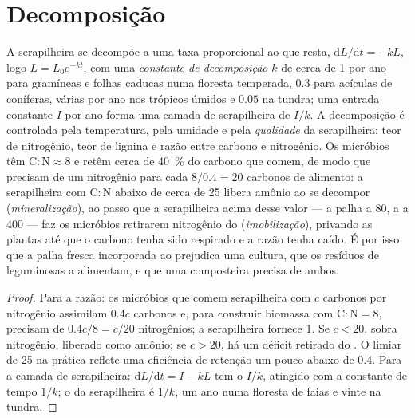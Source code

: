 \section{Decomposição}

\begin{theorem}\label{thm:b2:living-soil:decay}
A serapilheira se decompõe a uma taxa proporcional ao que resta,
$\mathrm{d}L/\mathrm{d}t = -kL$, logo $L = L_0 e^{-kt}$, com uma
\emph{constante de decomposição} $k$ de cerca de 1 por ano para gramíneas
e folhas caducas numa floresta temperada, $0.3$ para acículas de
coníferas, várias por ano nos trópicos úmidos e $0.05$ na tundra;
uma entrada constante $I$ por ano forma uma camada de serapilheira de
$I/k$. A decomposição é controlada pela temperatura, pela umidade e pela
\emph{qualidade} da serapilheira: teor de nitrogênio, teor de lignina e
razão entre carbono e nitrogênio. Os micróbios têm $\mathrm{C:N} \approx 8$
e retêm cerca de \qty{40}{\%} do carbono que comem, de modo que precisam
de um nitrogênio para cada $8/0.4 = 20$ carbonos de alimento: a
serapilheira com $\mathrm{C:N}$
abaixo de cerca de 25 libera amônio ao se decompor
(\emph{mineralização}), ao passo que a serapilheira acima desse valor ---
a palha a 80, a  a 400 --- faz os micróbios retirarem nitrogênio
do  (\emph{imobilização}), privando as plantas até que o carbono
tenha sido respirado e a razão tenha caído. É por isso que a palha
fresca incorporada ao  prejudica uma cultura, que os resíduos de
leguminosas a alimentam, e que uma composteira precisa de ambos.
\end{theorem}
\begin{proof}
Para a razão: os micróbios que comem serapilheira com $c$ carbonos por
nitrogênio assimilam $0.4c$ carbonos e, para construir biomassa com
$\mathrm{C:N} = 8$, precisam de $0.4c/8 = c/20$ nitrogênios; a
serapilheira fornece 1. Se $c < 20$, sobra nitrogênio, liberado como
amônio; se $c > 20$, há um déficit retirado do . O limiar de 25 na
prática reflete uma eficiência de retenção um pouco abaixo de 0.4. Para
a camada de serapilheira: $\mathrm{d}L/\mathrm{d}t = I - kL$
tem o  $I/k$, atingido com a constante de tempo $1/k$;
o  da serapilheira é $1/k$, um ano numa floresta de
faias e vinte na tundra.
\end{proof}
